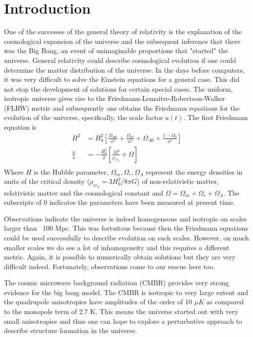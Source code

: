 \documentclass[12pt,a4paper,twoside]{book}
\begin{document}
	\section{Introduction}
		One of the successes of the general theory of relativity is the explanation of the cosmological expansion of the universe and the subsequent inference that there was the Big Bang, an event of unimaginable proportions that "started" the universe. General relativity could describe cosmological evolution if one could determine the matter distribution of the universe. In the days before computers, it was very difficult to solve the Einstein equations for a general case. This did not stop the development of solutions for certain special cases. The uniform, isotropic universe gives rise to the Friedmann-Lemaitre-Robertson-Walker (FLRW) metric and subsequently one obtains the Friedmann equations for the evolution of the universe, specifically, the scale factor $a(t)$. The first Friedmann equation is
		\begin{equation}
			\begin{aligned}
				H^2&=H_0^2\left[\frac{\Omega_{m0}}{a^3}+
													\frac{{\Omega}_{r0}}{a^4}+
													{\Omega}_{\Lambda 0}+
													\frac{1-\Omega_0}{a^2}\right]\\
				\frac{\ddot{a}}{a}&=-\frac{H_0^2}{2}[\frac{3P}{\rho_{cr_0}}+\Omega]\\
			\end{aligned}
		\end{equation}
		Where $H$ is the Hubble parameter, $\Omega_{m},\Omega_{r},\Omega_{\Lambda}$ represent the energy densities in units of the critical density ($\rho_{cr_0}=3H_0^2/8\pi G$) of non-relativistic matter, relativistic matter and the cosmological constant and $\Omega=\Omega_{m}+\Omega_{r}+\Omega_{\Lambda }$. The subscripts of 0 indicates the parameters have been measured at present time.
		
		Observations indicate the universe is indeed homogeneous and isotropic on scales larger than ~100 Mpc. This was fortuitous because then the Friedmann equations could be used successfully to describe evolution on such scales. However, on much smaller scales we do see a lot of inhomogeneity and this requires a different metric. Again, it is possible to numerically obtain solutions but they are very difficult indeed. Fortunately, observations come to our rescue here too.
		
		The cosmic microwave background radiation (CMBR) provides very strong evidence for the big bang model. The CMBR is isotropic to very large extent and the quadrupole anisotropies have amplitudes of the order of 10 $\mu K$ as compared to the monopole term of 2.7 K. This means the universe started out with very small anisotropies and thus one can hope to explore a perturbative approach to describe structure formation in the universe.
		
\end{document}
